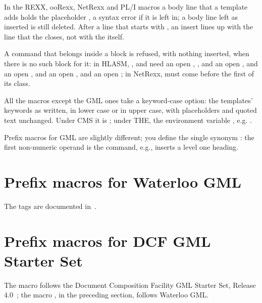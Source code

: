 \documentclass[11pt]{article}
\begin{document}
In the REXX, ooRexx, NetRexx and PL/I macros a body line that a template adds holds the placeholder , a syntax error if it is left in; a body line left as inserted is still deleted. After a line that starts with , an insert lines up with the line that the  closes, not with the  itself.

A command that belongs inside a block is refused, with nothing inserted, when there is no such block for it: in HLASM, ,  and  need an open , ,  and  an open ,  and  an open ,  and  an open , and  an open ; in NetRexx,  must come before the first  of its class.

All the macros except the GML ones take a keyword-case option: the templates' keywords as written, in lower case or in upper case, with placeholders and quoted text unchanged. Under CMS it is   ; under THE, the environment variable , e.g. .

Prefix macros for GML are slightly different; you define the single synonym : the first non-numeric operand is the command, e.g.,  inserts a level one heading.

\section*{Prefix macros for Waterloo GML}

The tags are documented in~\cite{wgml}.

\begin{description}

\end{description}

\section*{Prefix macros for DCF GML Starter Set}

The macro  follows the Document Composition Facility GML Starter Set, Release 4.0~\cite{dcfss,dcfqr}; the macro , in the preceding section, follows Waterloo GML.
\end{document}
